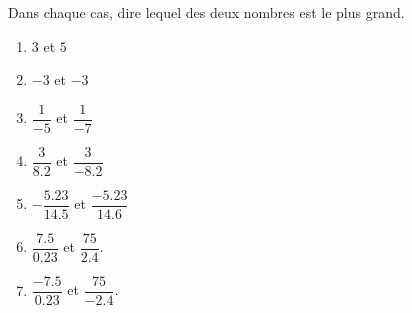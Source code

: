 
\begin{exercice}\label{exo2smath-0024}

Dans chaque cas, dire lequel des deux nombres est le plus grand.
\begin{multicols}{3}
    \begin{enumerate}
        \item
            \( 3\) et \( 5\)
        \item
            \( -3\) et \( -3\)
        \item
            \( \dfrac{ 1 }{ -5 }\) et \( \dfrac{ 1 }{ -7 }\)
        \item
            \( \dfrac{ 3 }{ 8.2 }\) et \( \dfrac{ 3 }{ -8.2 }\)
        \item
            \( -\dfrac{ 5.23 }{ 14.5 }\) et \( \dfrac{ -5.23 }{ 14.6 }\)
        \item
            \( \dfrac{ 7.5 }{ 0.23 }\) et \( \dfrac{ 75 }{ 2.4 }\).
        \item
            \( \dfrac{ -7.5 }{ 0.23 }\) et \( \dfrac{ 75 }{ -2.4 }\).
    \end{enumerate}
\end{multicols}

\end{exercice}
